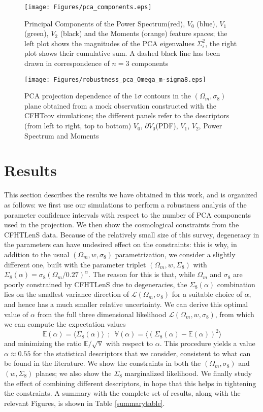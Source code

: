 \documentclass[reprint,aps,prd,superscriptaddress,showkeys,showpacs]{revtex4-1}
\begin{document}
%
\begin{figure*}
\texttt{[image: Figures/pca\_components.eps]}
\caption{Principal Components of the Power Spectrum(red), $V_0$ (blue), $V_1$ (green), $V_2$ (black) and the Moments (orange) feature spaces; the left plot shows the magnitudes of the PCA eigenvalues $\Sigma_i^2$, the right plot shows their cumulative sum. A dashed black line has been drawn in correspondence of $n=3$ components}
\label{pcafig}
\end{figure*}
%
\begin{figure*}
\texttt{[image: Figures/robustness\_pca\_Omega\_m-sigma8.eps]}
\caption{PCA projection dependence of the $1\sigma$ contours in the $(\Omega_m,\sigma_8)$ plane obtained from a mock observation constructed with the CFHTcov simulations; the different panels refer to the descriptors (from left to right, top to bottom) $V_0$, $\partial V_0$(PDF), $V_1$, $V_2$, Power Spectrum and Moments}
\label{robustnessfig}
\end{figure*}
%

\section{Results}
\label{results}
This section describes the results we have obtained in this work, and is organized as follows: we first use our simulations to perform a robustness analysis of the parameter confidence intervals with respect to the number of PCA components used in the projection. We then show the cosmological constraints from the CFHTLenS data. Because of the relatively small size of this survey, degeneracy in the parameters can have undesired effect on the constraints: this is why, in addition to the usual $(\Omega_m,w,\sigma_8)$ parametrization, we consider a slightly different one, built with the parameter triplet $(\Omega_m,w,\Sigma_8)$ with $\Sigma_8(\alpha)=\sigma_8(\Omega_m/0.27)^\alpha$. The reason for this is that, while $\Omega_m$ and $\sigma_8$ are poorly constrained by CFHTLenS due to degeneracies, the $\Sigma_8(\alpha)$ combination lies on the smallest variance direction of $\mathcal{L}(\Omega_m,\sigma_8)$ for a suitable choice of $\alpha$, and hence has a much smaller relative uncertainty. We can derive this optimal value of $\alpha$ from the full three dimensional likelihood $\mathcal{L}(\Omega_m,w,\sigma_8)$, from which we can compute the expectation values
\begin{equation}
\mathds{E}(\alpha) = \langle\Sigma_8(\alpha)\rangle \,\,\, ; \,\,\, \mathds{V}(\alpha) = \langle(\Sigma_8(\alpha)-\mathds{E}(\alpha))^2\rangle
\end{equation}
%
and minimizing the ratio $\mathds{E}/\sqrt{\mathds{V}}$ with respect to $\alpha$. This procedure yields a value $\alpha\approx0.55$ for the statistical descriptors that we consider, consistent to what can be found in the literature. We show the constraints in both the $(\Omega_m,\sigma_8)$ and $(w,\Sigma_8)$ planes; we also show the $\Sigma_8$ marginalized likelihood. We finally study the effect of combining different descriptors, in hope that this helps in tightening the constraints. A summary with the complete set of results, along with the relevant Figures, is shown in Table \ref{summarytable}. 
\end{document}
